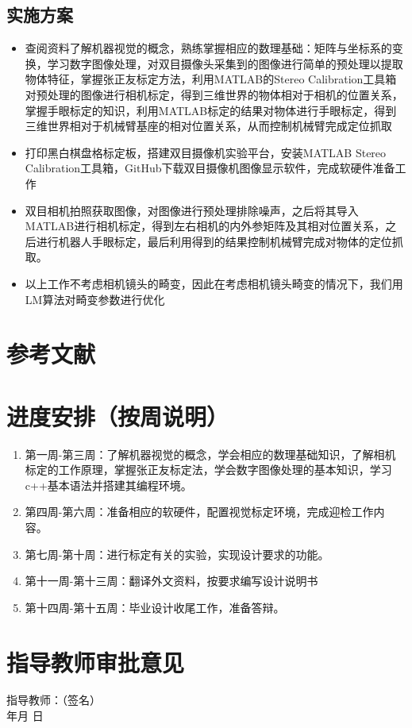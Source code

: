 \documentclass{article}
\begin{document}
\subsection{实施方案}
\begin{itemize}
	\item 查阅资料了解机器视觉的概念，熟练掌握相应的数理基础：矩阵与坐标系的变换，学习数字图像处理，对双目摄像头采集到的图像进行简单的预处理以提取物体特征，掌握张正友标定方法，利用MATLAB的Stereo Calibration工具箱对预处理的图像进行相机标定，得到三维世界的物体相对于相机的位置关系，掌握手眼标定的知识，利用MATLAB标定的结果对物体进行手眼标定，得到三维世界相对于机械臂基座的相对位置关系，从而控制机械臂完成定位抓取
	\item 打印黑白棋盘格标定板，搭建双目摄像机实验平台，安装MATLAB Stereo Calibration工具箱，GitHub下载双目摄像机图像显示软件，完成软硬件准备工作
	\item 双目相机拍照获取图像，对图像进行预处理排除噪声，之后将其导入MATLAB进行相机标定，得到左右相机的内外参矩阵及其相对位置关系，之后进行机器人手眼标定，最后利用得到的结果控制机械臂完成对物体的定位抓取。
	\item 以上工作不考虑相机镜头的畸变，因此在考虑相机镜头畸变的情况下，我们用LM算法对畸变参数进行优化
	
\end{itemize}










\section{参考文献}








\section{进度安排（按周说明）}
\begin{enumerate}
	\item 第一周-第三周：了解机器视觉的概念，学会相应的数理基础知识，了解相机标定的工作原理，掌握张正友标定法，学会数字图像处理的基本知识，学习c++基本语法并搭建其编程环境。
	\item 第四周-第六周：准备相应的软硬件，配置视觉标定环境，完成迎检工作内容。
	\item 第七周-第十周：进行标定有关的实验，实现设计要求的功能。
	\item 第十一周-第十三周：翻译外文资料，按要求编写设计说明书
	\item 第十四周-第十五周：毕业设计收尾工作，准备答辩。
	
\end{enumerate}
\section{指导教师审批意见}
\begin{flushright}
	指导教师：\quad \quad（签名）\\
	年\quad 月 \quad 日
\end{flushright}
\end{document}
